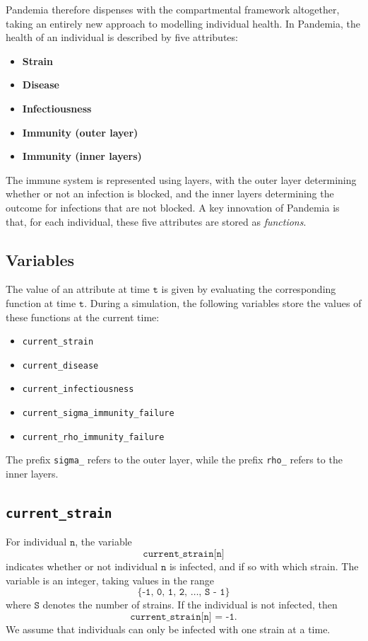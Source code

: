 \documentclass[10pt,letterpaper]{article}
\begin{document}
Pandemia therefore dispenses with the compartmental framework altogether, taking an entirely new approach to modelling individual health. In Pandemia, the health of an individual is described by five attributes:
\begin{itemize}
\item \textbf{Strain}
\item \textbf{Disease}
\item \textbf{Infectiousness}
\item \textbf{Immunity (outer layer)}
\item \textbf{Immunity (inner layers)}
\end{itemize}
The immune system is represented using layers, with the outer layer determining whether or not an infection is blocked, and the inner layers determining the outcome for infections that are not blocked. A key innovation of Pandemia is that, for each individual, these five attributes are stored as \textit{functions}.

\subsection*{Variables}
The value of an attribute at time $\texttt{t}$ is given by evaluating the corresponding function at time $\texttt{t}$. During a simulation, the following variables store the values of these functions at the current time:
\begin{itemize}
\item \texttt{current{\_}strain}
\item \texttt{current{\_}disease}
\item \texttt{current{\_}infectiousness}
\item \texttt{current{\_}sigma{\_}immunity{\_}failure}
\item \texttt{current{\_}rho{\_}immunity{\_}failure}
\end{itemize}
The prefix \texttt{sigma{\_}} refers to the outer layer, while the prefix \texttt{rho{\_}} refers to the inner layers.

\subsection*{\texttt{current{\_}strain}}
For individual $\texttt{n}$, the variable $$\texttt{current{\_}strain[n]}$$ indicates whether or not individual $\texttt{n}$ is infected, and if so with which strain. The variable is an integer, taking values in the range $$\texttt{\{-1, 0, 1, 2, \ldots, S - 1\}}$$ where $\texttt{S}$ denotes the number of strains. If the individual is not infected, then $$\texttt{current{\_}strain[n] = -1}.$$ We assume that individuals can only be infected with one strain at a time.
\end{document}
